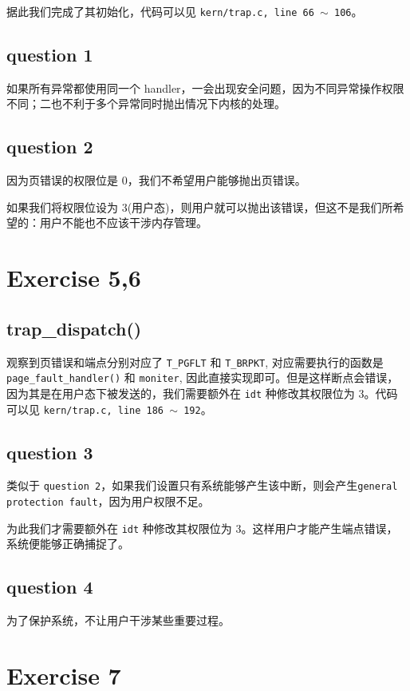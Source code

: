 \documentclass[11pt]{article}
\begin{document}
			 据此我们完成了其初始化，代码可以见 \texttt{kern/trap.c, line 66 $\sim$ 106}。
		
		\subsection*{question 1}
			如果所有异常都使用同一个 handler，一会出现安全问题，因为不同异常操作权限不同；二也不利于多个异常同时抛出情况下内核的处理。
	
		\subsection*{question 2}
			因为页错误的权限位是 0，我们不希望用户能够抛出页错误。
			
			如果我们将权限位设为 3(用户态)，则用户就可以抛出该错误，但这不是我们所希望的：用户不能也不应该干涉内存管理。
	
	\section{Exercise 5,6}
	
		\subsection*{trap\_dispatch()}
			观察到页错误和端点分别对应了 \texttt{T\_PGFLT} 和 \texttt{T\_BRPKT}, 对应需要执行的函数是 \texttt{page\_fault\_handler()} 和 \texttt{moniter}, 因此直接实现即可。但是这样断点会错误，因为其是在用户态下被发送的，我们需要额外在 \texttt{idt} 种修改其权限位为 3。代码可以见 \texttt{kern/trap.c, line 186 $\sim$ 192}。
		
		\subsection*{question 3}
			类似于 \texttt{question 2}，如果我们设置只有系统能够产生该中断，则会产生\texttt{general protection fault}，因为用户权限不足。
			
			为此我们才需要额外在 \texttt{idt} 种修改其权限位为 3。这样用户才能产生端点错误，系统便能够正确捕捉了。
			
		\subsection*{question 4}
			为了保护系统，不让用户干涉某些重要过程。
	
	\section{Exercise 7}
	
\end{document}
